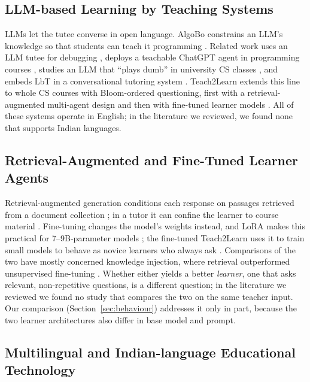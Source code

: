 \documentclass[pdflatex,sn-mathphys-num]{sn-jnl}%
\theoremstyle{thmstyleone}%
\theoremstyle{thmstyletwo}%
\theoremstyle{thmstylethree}%
\begin{document}
\subsection{LLM-based Learning by Teaching Systems}

LLMs let the tutee converse in open language. AlgoBo constrains an LLM's knowledge so that students
can teach it programming \cite{jin2024teach}. Related work uses an LLM tutee for debugging
\cite{ma2024debugging}, deploys a teachable ChatGPT agent in programming courses \cite{chen2024bjet},
studies an LLM that ``plays dumb'' in university CS classes \cite{rogers2025playing}, and embeds LbT
in a conversational tutoring system \cite{schmucker2024ruffle}. Teach2Learn extends this line to
whole CS courses with Bloom-ordered questioning, first with a retrieval-augmented multi-agent design
\cite{lahoria2025teach2learn} and then with fine-tuned learner models \cite{finetunedT2L}. All of these
systems operate in English; in the literature we reviewed, we found none that supports Indian
languages.

\subsection{Retrieval-Augmented and Fine-Tuned Learner Agents}

Retrieval-augmented generation conditions each response on passages retrieved from a document
collection \cite{lewis2020rag}; in a tutor it can confine the learner to course material
\cite{lahoria2025teach2learn}. Fine-tuning changes the model's weights instead, and LoRA makes this
practical for 7--9B-parameter models \cite{hu2022lora}; the fine-tuned Teach2Learn uses it to train
small models to behave as novice learners who always ask \cite{finetunedT2L}. Comparisons of the two
have mostly concerned knowledge injection, where retrieval outperformed unsupervised fine-tuning
\cite{ovadia2024}. Whether either yields a better \emph{learner}, one that asks relevant,
non-repetitive questions, is a different question; in the literature we reviewed we found no study
that compares the two on the same teacher input. Our comparison (Section~\ref{sec:behaviour})
addresses it only in part, because the two learner architectures also differ in base model and
prompt.

\subsection{Multilingual and Indian-language Educational Technology}
\end{document}
